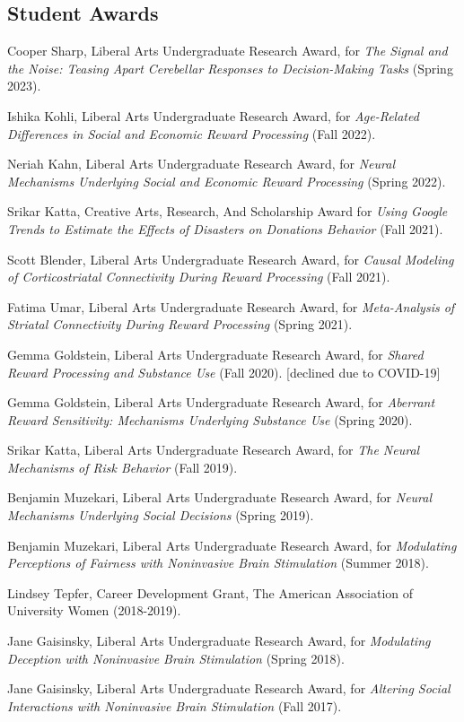 \documentclass[11pt, letterpaper]{article}
\begin{document}
\subsection*{Student Awards}

\begin{hangparas}{.5in}{1}
Cooper Sharp, Liberal Arts Undergraduate Research Award, for \textit{The Signal and the Noise: Teasing Apart Cerebellar Responses to Decision-Making Tasks} (Spring 2023).

Ishika Kohli, Liberal Arts Undergraduate Research Award, for \textit{Age-Related Differences in Social and Economic Reward Processing} (Fall 2022).

Neriah Kahn, Liberal Arts Undergraduate Research Award, for \textit{Neural Mechanisms Underlying Social and Economic Reward Processing} (Spring 2022).

Srikar Katta, Creative Arts, Research, And Scholarship Award for \textit{Using Google Trends to Estimate the Effects of Disasters on Donations Behavior} (Fall 2021).

Scott Blender, Liberal Arts Undergraduate Research Award, for \textit{Causal Modeling of Corticostriatal Connectivity During Reward Processing} (Fall 2021).

Fatima Umar, Liberal Arts Undergraduate Research Award, for \textit{Meta-Analysis of Striatal Connectivity During Reward Processing} (Spring 2021).

Gemma Goldstein, Liberal Arts Undergraduate Research Award, for \textit{Shared Reward Processing and Substance Use} (Fall 2020). [declined due to COVID-19]

Gemma Goldstein, Liberal Arts Undergraduate Research Award, for \textit{Aberrant Reward Sensitivity: Mechanisms Underlying Substance Use} (Spring 2020). 

Srikar Katta, Liberal Arts Undergraduate Research Award, for \textit{The Neural Mechanisms of Risk Behavior} (Fall 2019).

Benjamin Muzekari, Liberal Arts Undergraduate Research Award, for \textit{Neural Mechanisms Underlying Social Decisions} (Spring 2019).

Benjamin Muzekari, Liberal Arts Undergraduate Research Award, for \textit{Modulating Perceptions of Fairness with Noninvasive Brain Stimulation} (Summer 2018).

Lindsey Tepfer, Career Development Grant, The American Association of University Women (2018-2019).

Jane Gaisinsky, Liberal Arts Undergraduate Research Award, for \textit{Modulating Deception with Noninvasive Brain Stimulation} (Spring 2018).

Jane Gaisinsky, Liberal Arts Undergraduate Research Award, for \textit{Altering Social Interactions with Noninvasive Brain Stimulation} (Fall 2017). \\

\end{hangparas}
\end{document}
